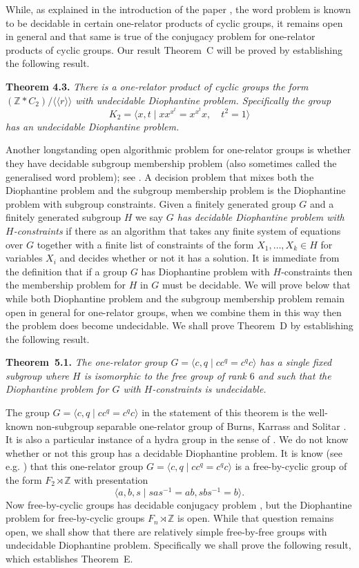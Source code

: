 \documentclass[11pt]{amsart}
\theoremstyle{definition}
\numberwithin{theorem}{section}
\newcommand{\Z}{\mathbb{Z}}
\begin{document}
While, as explained in the introduction of the paper \cite{DuncanArye}, the word problem is known to be decidable in certain one-relator products of cyclic groups, it remains open in general and that same is true of the conjugacy problem for one-relator products of cyclic groups.  
Our result Theorem~C will be proved by establishing the following result. 

\textbf{Theorem 4.3.}
\emph{There is a one-relator product of cyclic groups the form $(\Z \ast C_2) / \langle \langle r \rangle \rangle$ with undecidable Diophantine problem. Specifically the group
\[
  K_2 = \langle x, t \mid
x x^{x^t} = x^{x^t} x,  
\quad 
  t^2=1
  \rangle
\]
has an undecidable Diophantine problem.}

Another longstanding open algorithmic problem for one-relator groups is whether they have decidable subgroup membership problem (also sometimes called the generalised word problem); see \cite[Problem 1.8.8]{CFMarcoOneRelatorSurvey}. A decision problem that mixes both the Diophantine problem and the subgroup membership problem is the Diophantine problem with subgroup constraints. Given a finitely generated group $G$ and a finitely generated subgroup $H$ we say \emph{$G$ has decidable Diophantine problem with $H$-constraints} if there as an algorithm that takes any finite system of equations over $G$ together with a finite list of constraints of the form $X_1, \ldots, X_k \in H$ for variables $X_i$ and decides whether or not it has a solution. It is immediate from the definition that if a group $G$ has Diophantine problem with $H$-constraints then the membership problem for $H$ in $G$ must be decidable. We will prove below that while both Diophantine problem and the subgroup membership problem remain open in general for one-relator groups, when we combine them in this way then the problem does become undecidable. 
We shall prove Theorem~D by establishing the following result.  

\textbf{Theorem~5.1.}
\emph{The one-relator group $G = \langle c, q \mid cc^q = c^qc \rangle$ has a single fixed subgroup where $H$ is isomorphic to the free group of rank $6$ and such that the Diophantine problem for $G$ with $H$-constraints is undecidable.} 

The group $G = \langle c, q \mid cc^q = c^qc  \rangle$ in the statement of this theorem is the well-known  non-subgroup separable one-relator group of Burns, Karrass and Solitar \cite{Burns1987}.
It is also a particular instance of a hydra group in the sense of \cite{HydraGroups}. 
We do not know whether or not this group  
has a decidable Diophantine problem.
It is know (see e.g. \cite[Section~2]{Burns1987}) that this one-relator group 
$G = \langle c, q \mid cc^q = c^qc  \rangle$
is a free-by-cyclic group of the form $F_2 \rtimes \Z$ with presentation     
\[
  \langle a, b, s \mid sas^{-1} = ab, sbs^{-1} = b\rangle.
\]
Now free-by-cyclic groups has decidable conjugacy problem \cite{Bogopolski2006}, but the Diophantine problem for free-by-cyclic groups $F_n \rtimes \Z$ is open. 
While that question remains open, we shall show that there are relatively simple free-by-free groups with undecidable Diophantine problem.  
Specifically we shall prove the following result, which establishes Theorem~E.    
\end{document}
